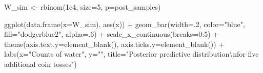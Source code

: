 \documentclass[
  letterpaper,
  DIV=11,
  numbers=noendperiod,
  oneside]{scrartcl}
\newenvironment{Shaded}{\begin{snugshade}}{\end{snugshade}}
\newcommand{\AttributeTok}[1]{\textcolor[rgb]{0.40,0.45,0.13}{#1}}
\newcommand{\DecValTok}[1]{\textcolor[rgb]{0.68,0.00,0.00}{#1}}
\newcommand{\FloatTok}[1]{\textcolor[rgb]{0.68,0.00,0.00}{#1}}
\newcommand{\FunctionTok}[1]{\textcolor[rgb]{0.28,0.35,0.67}{#1}}
\newcommand{\NormalTok}[1]{\textcolor[rgb]{0.00,0.23,0.31}{#1}}
\newcommand{\OtherTok}[1]{\textcolor[rgb]{0.00,0.23,0.31}{#1}}
\newcommand{\SpecialCharTok}[1]{\textcolor[rgb]{0.37,0.37,0.37}{#1}}
\newcommand{\StringTok}[1]{\textcolor[rgb]{0.13,0.47,0.30}{#1}}
\begin{document}
\begin{Shaded}
\begin{Highlighting}[]
\NormalTok{W\_sim }\OtherTok{\textless{}{-}} \FunctionTok{rbinom}\NormalTok{(}\FloatTok{1e4}\NormalTok{, }\AttributeTok{size=}\DecValTok{5}\NormalTok{, }\AttributeTok{p=}\NormalTok{post\_samples)}

\FunctionTok{ggplot}\NormalTok{(}\FunctionTok{data.frame}\NormalTok{(}\AttributeTok{x=}\NormalTok{W\_sim), }\FunctionTok{aes}\NormalTok{(x)) }\SpecialCharTok{+} 
  \FunctionTok{geom\_bar}\NormalTok{(}\AttributeTok{width=}\NormalTok{.}\DecValTok{2}\NormalTok{,}
           \AttributeTok{color=}\StringTok{"blue"}\NormalTok{,}
           \AttributeTok{fill=}\StringTok{"dodgerblue2"}\NormalTok{,}
           \AttributeTok{alpha=}\NormalTok{.}\DecValTok{6}\NormalTok{) }\SpecialCharTok{+}
  \FunctionTok{scale\_x\_continuous}\NormalTok{(}\AttributeTok{breaks=}\DecValTok{0}\SpecialCharTok{:}\DecValTok{5}\NormalTok{) }\SpecialCharTok{+}
  \FunctionTok{theme}\NormalTok{(}\AttributeTok{axis.text.y=}\FunctionTok{element\_blank}\NormalTok{(),}
        \AttributeTok{axis.ticks.y=}\FunctionTok{element\_blank}\NormalTok{()) }\SpecialCharTok{+}
  \FunctionTok{labs}\NormalTok{(}\AttributeTok{x=}\StringTok{"Counts of water"}\NormalTok{,}
       \AttributeTok{y=}\StringTok{""}\NormalTok{,}
       \AttributeTok{title=}\StringTok{"Posterior predictive distribution}\SpecialCharTok{\textbackslash{}n}\StringTok{for five additional coin tosses"}\NormalTok{)}
\end{Highlighting}
\end{Shaded}
\end{document}
